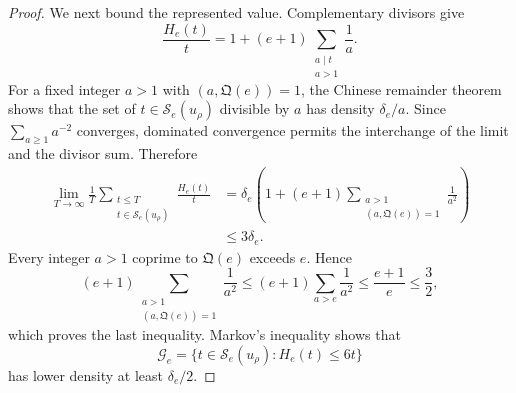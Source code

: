 \documentclass[11pt]{article}
\theoremstyle{remark}
\newcommand{\1}{\mathbf 1}
\begin{document}
\begin{proof}
We next bound the represented value.  Complementary divisors give
\[
 \frac{H_e(t)}t
 =1+(e+1)\sum_{\substack{a\mid t\\a>1}}\frac1a.
\]
For a fixed integer $a>1$ with $(a,\mathfrak Q(e))=1$, the Chinese remainder theorem
shows that the set of $t\in\mathcal S_e(u_\rho)$ divisible by $a$ has density
$\delta_e/a$.  Since $\sum_{a\geq1}a^{-2}$ converges, dominated
convergence permits the interchange of the limit and the divisor sum.
Therefore
\begin{align*}
 \lim_{T\to\infty}\frac1T
 \sum_{\substack{t\leq T\\t\in\mathcal S_e(u_\rho)}}\frac{H_e(t)}t
 &=\delta_e\left(1+(e+1)
 \sum_{\substack{a>1\\(a,\mathfrak Q(e))=1}}\frac1{a^2}\right)\\
 &\leq3\delta_e.
\end{align*}
Every integer $a>1$ coprime to $\mathfrak Q(e)$ exceeds $e$.  Hence
\[
 (e+1)\sum_{\substack{a>1\\(a,\mathfrak Q(e))=1}}\frac1{a^2}
 \leq(e+1)\sum_{a>e}\frac1{a^2}
 \leq\frac{e+1}{e}\leq\frac32,
\]
which proves the last inequality.  Markov's
inequality shows that
\[
 \mathcal G_e=\{t\in\mathcal S_e(u_\rho):H_e(t)\leq6t\}
\]
has lower density at least $\delta_e/2$.


\end{proof}
\end{document}
